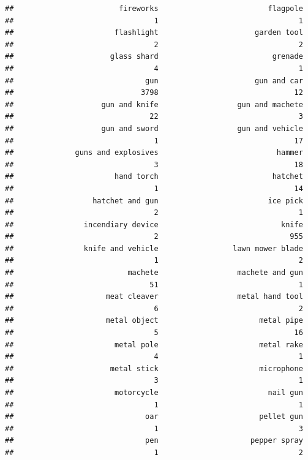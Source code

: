 \documentclass[
]{article}
\begin{document}
\begin{verbatim}
##                        fireworks                         flagpole 
##                                1                                1 
##                       flashlight                      garden tool 
##                                2                                2 
##                      glass shard                          grenade 
##                                4                                1 
##                              gun                      gun and car 
##                             3798                               12 
##                    gun and knife                  gun and machete 
##                               22                                3 
##                    gun and sword                  gun and vehicle 
##                                1                               17 
##              guns and explosives                           hammer 
##                                3                               18 
##                       hand torch                          hatchet 
##                                1                               14 
##                  hatchet and gun                         ice pick 
##                                2                                1 
##                incendiary device                            knife 
##                                2                              955 
##                knife and vehicle                 lawn mower blade 
##                                1                                2 
##                          machete                  machete and gun 
##                               51                                1 
##                     meat cleaver                  metal hand tool 
##                                6                                2 
##                     metal object                       metal pipe 
##                                5                               16 
##                       metal pole                       metal rake 
##                                4                                1 
##                      metal stick                       microphone 
##                                3                                1 
##                       motorcycle                         nail gun 
##                                1                                1 
##                              oar                       pellet gun 
##                                1                                3 
##                              pen                     pepper spray 
##                                1                                2 

\end{verbatim}
\end{document}

